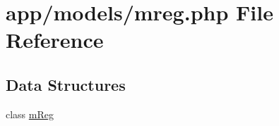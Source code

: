 \hypertarget{mreg_8php}{}\section{app/models/mreg.php File Reference}
\label{mreg_8php}
\subsection*{Data Structures}
\begin{DoxyCompactItemize}
\item 
class \hyperlink{classmReg}{m\+Reg}
\end{DoxyCompactItemize}
